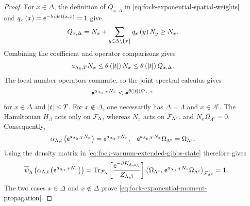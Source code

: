 \documentclass[11pt,a4paper]{article}
\theoremstyle{plain}
\theoremstyle{definition}
\theoremstyle{remark}
\begin{document}
\begin{proof}
For $x\in\Delta$, the definition of $Q_{x,\Delta}$ in
\eqref{eq:fock-exponential-spatial-weights} and
$q_x \left( x \right)=\mathsf{e}^{-b\operatorname{dist} \left( x,x \right)}=1$ give
$$\begin{aligned}
Q_{x,\Delta}
& =
N_x+
\sum_{y\in\Delta\setminus\left\{ x \right\}}
q_x \left( y \right)N_y
\geq
N_x.
\end{aligned}$$
Combining the coefficient and operator comparisons gives
$$\begin{aligned}
a_{\Lambda_0,T}N_x
& \leq
\theta \left( \left| t \right| \right)N_x
\leq
\theta \left( \left| t \right| \right)Q_{x,\Delta}.
\end{aligned}$$
The local number operators commute, so the joint spectral calculus gives
$$\begin{aligned}
\mathsf{e}^{a_{\Lambda_0,T}N_x}
& \leq
\mathsf{e}^{\theta \left( \left| t \right| \right)Q_{x,\Delta}}
\end{aligned}$$
for $x\in\Delta$ and $\left| t \right|\leq T$.
For $x\notin\Delta$, one necessarily has $\Delta=\Lambda$ and
$x\in\Lambda^{\mathrm{c}}$.
The Hamiltonian $H_{\Lambda}$ acts only on $\sphilb{F}_{\Lambda}$, whereas $N_x$ acts on
$\sphilb{F}_{\Lambda^{\mathrm{c}}}$, and $N_x\Omega_{\Lambda^{\mathrm{c}}}=0$.
Consequently,
$$\begin{aligned}
\alpha_{\Lambda,t} \left( \mathsf{e}^{a_{\Lambda_0,T}N_x} \right)
& =
\mathsf{e}^{a_{\Lambda_0,T}N_x},
&
\mathsf{e}^{a_{\Lambda_0,T}N_x}\Omega_{\Lambda^{\mathrm{c}}}
& =
\Omega_{\Lambda^{\mathrm{c}}}.
\end{aligned}$$
Using the density matrix in \eqref{eq:fock-vacuum-extended-gibbs-state} therefore gives
$$\begin{aligned}
\fun{\oastate[\overline{\psi}_{\Lambda}]}{
\fun{\alpha_{\Lambda,t}}{\napiernum^{a_{\Lambda_0,T}N_x}}}
=
\sqfun{\trace_{\sphilb{F}_{\Lambda}}}{
\frac{\napiernum^{-\beta K_{\Lambda,\smchemicalpotential_{\Lambda}}}}
{Z_{\Lambda,\beta}}}
\bkt{\Omega_{\Lambda^{\mathrm{c}}}}{
\napiernum^{a_{\Lambda_0,T}N_x}\Omega_{\Lambda^{\mathrm{c}}}}
_{\sphilb{F}_{\Lambda^{\mathrm{c}}}}
=
1.
\end{aligned}$$
The two cases $x\in\Delta$ and $x\notin\Delta$ prove
\eqref{eq:fock-exponential-moment-propagation}.


\end{proof}
\end{document}
